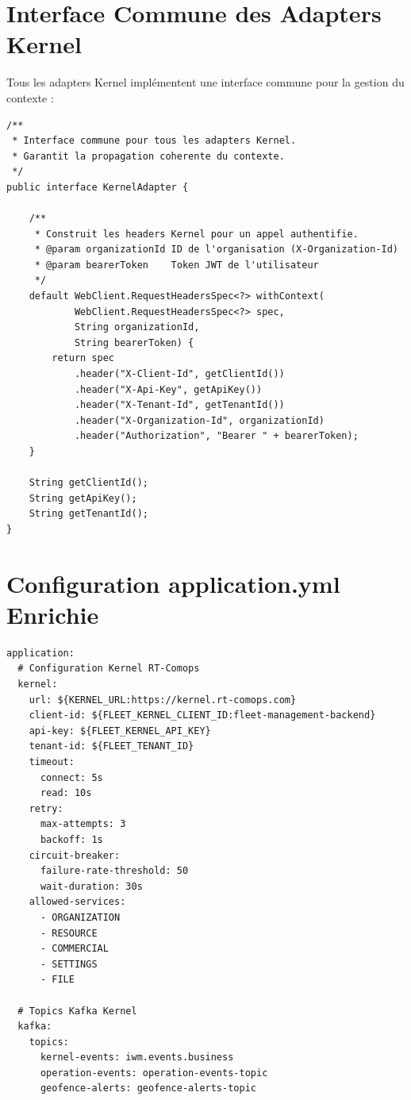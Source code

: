 \documentclass[12pt,a4paper]{report}
\begin{document}
\section{Interface Commune des Adapters Kernel}

Tous les adapters Kernel implémentent une interface commune
pour la gestion du contexte :

\begin{lstlisting}[style=javaStyle, caption={Interface commune KernelAdapter}]
/**
 * Interface commune pour tous les adapters Kernel.
 * Garantit la propagation coherente du contexte.
 */
public interface KernelAdapter {

    /**
     * Construit les headers Kernel pour un appel authentifie.
     * @param organizationId ID de l'organisation (X-Organization-Id)
     * @param bearerToken    Token JWT de l'utilisateur
     */
    default WebClient.RequestHeadersSpec<?> withContext(
            WebClient.RequestHeadersSpec<?> spec,
            String organizationId,
            String bearerToken) {
        return spec
            .header("X-Client-Id", getClientId())
            .header("X-Api-Key", getApiKey())
            .header("X-Tenant-Id", getTenantId())
            .header("X-Organization-Id", organizationId)
            .header("Authorization", "Bearer " + bearerToken);
    }

    String getClientId();
    String getApiKey();
    String getTenantId();
}
\end{lstlisting}

\section{Configuration application.yml Enrichie}

\begin{lstlisting}[style=yamlStyle, caption={Configuration complète de l'intégration Kernel}]
application:
  # Configuration Kernel RT-Comops
  kernel:
    url: ${KERNEL_URL:https://kernel.rt-comops.com}
    client-id: ${FLEET_KERNEL_CLIENT_ID:fleet-management-backend}
    api-key: ${FLEET_KERNEL_API_KEY}
    tenant-id: ${FLEET_TENANT_ID}
    timeout:
      connect: 5s
      read: 10s
    retry:
      max-attempts: 3
      backoff: 1s
    circuit-breaker:
      failure-rate-threshold: 50
      wait-duration: 30s
    allowed-services:
      - ORGANIZATION
      - RESOURCE
      - COMMERCIAL
      - SETTINGS
      - FILE

  # Topics Kafka Kernel
  kafka:
    topics:
      kernel-events: iwm.events.business
      operation-events: operation-events-topic
      geofence-alerts: geofence-alerts-topic
\end{lstlisting}
\end{document}
